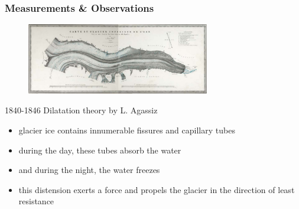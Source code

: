 \documentclass[hide notes,intlimits,unknownkeysallowed]{beamer}
\begin{document}
\begin{frame}
  \frametitle{Measurements \& Observations}
  \begin{figure}
    \includegraphics[width=8cm]{figures/agassi}%
  \end{figure}
    \begin{block}{1840-1846 Dilatation theory by L. Agassiz}
      \begin{itemize}
        \item glacier ice contains innumerable fissures and capillary tubes
        \item during the day, these tubes absorb the water
        \item and during the night, the water freezes
        \item this distension exerts a force and propels the glacier in the direction of least resistance
      \end{itemize}
    \end{block}
\end{frame}
\end{document}
